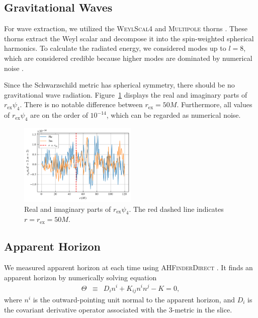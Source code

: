 \documentclass[%
 reprint,
 amsmath,amssymb,
 aps,
 prd,
]{revtex4-2}
\begin{document}
\subsection{Gravitational Waves}

For wave extraction, we utilized the \textsc{WeylScal4} and \textsc{Multipole} thorns \cite{Baker:2001sf}. These thorns extract the Weyl scalar and decompose it into the spin-weighted spherical harmonics. To calculate the radiated energy, we considered modes up to $l=8$, which are considered credible because higher modes are dominated by numerical noise \cite{Pollney:2009yz}.

Since the Schwarzschild metric has spherical symmetry, there should be no gravitational wave radiation. Figure~\ref{fig:psi4_r50} displays the real and imaginary parts of $r_\mathrm{ex}\psi_4$. There is no notable difference between $r_\mathrm{ex} = 50M$. Furthermore, all values of $r_\mathrm{ex}\psi_4$ are on the order of $10^{-14}$, which can be regarded as numerical noise.

\begin{figure}[h]
	\includegraphics[width=0.5\textwidth]{data/psi4_r50.png}%
	\caption{\label{fig:psi4_r50} Real and imaginary parts of $r_\mathrm{ex}\psi_4$. The red dashed line indicates $r=r_\mathrm{ex}=50M$.}
\end{figure}



\subsection{Apparent Horizon}

We measured apparent horizon at each time using \textsc{AHFinderDirect} \cite{Thornburg:1995cp, Thornburg:2003sf}. It finds an apparent horizon by numerically solving equation
\begin{eqnarray}
	\Theta &\equiv & D_i n^i + K_{ij} n^i n^j - K = 0,
\end{eqnarray}
where $n^i$ is the outward-pointing unit normal to the apparent horizon, and $D_i$ is the covariant derivative operator associated with the 3-metric in the slice.
\end{document}

